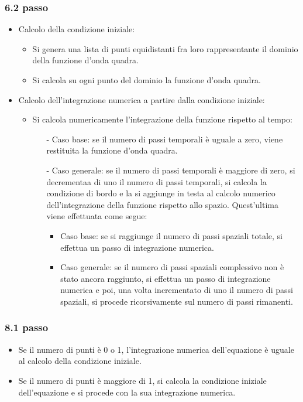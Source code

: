 \subsubsection*{6.2 passo}
\begin{itemize}
\item Calcolo della condizione iniziale:
\begin{itemize}
\item Si genera una lista di punti equidistanti fra loro rappresentante il dominio della funzione d'onda quadra.
\item Si calcola su ogni punto del dominio la funzione d'onda quadra. 
\end{itemize}
\item Calcolo dell'integrazione numerica a partire dalla condizione iniziale:
\begin{itemize}
\item Si calcola numericamente l'integrazione della funzione rispetto al tempo:
\begin{itemize}
\item[-] Caso base: se il numero di passi temporali è uguale a zero, viene restituita la funzione d'onda quadra.
\item[-] Caso generale: se il numero di passi temporali è maggiore di zero, si decrementaa di uno il numero di passi temporali, si calcola la condizione di bordo e la si aggiunge in testa al calcolo numerico dell'integrazione della funzione rispetto allo spazio. Quest'ultima viene effettuata come segue:
\begin{itemize}
\item Caso base: se si raggiunge il numero di passi spaziali totale, si effettua un passo di integrazione numerica.
\item Caso generale: se il numero di passi spaziali complessivo non è stato ancora raggiunto, si effettua un passo di integrazione numerica e poi, una volta incrementato di uno il numero di passi spaziali, si procede ricorsivamente sul numero di passi rimanenti. 
\end{itemize}
\end{itemize}
\end{itemize}
\end{itemize}

\subsubsection*{8.1 passo}
\begin{itemize}
\item Se il numero di punti è 0 o 1, l'integrazione numerica dell'equazione è uguale al calcolo della condizione iniziale.
\item Se il numero di punti è maggiore di 1, si calcola la condizione iniziale dell'equazione e si procede con la sua integrazione numerica. 
\end{itemize}

